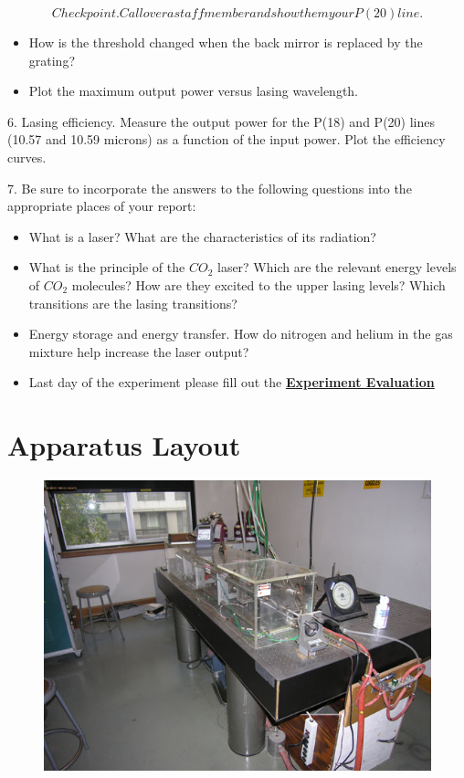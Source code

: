 \documentclass{../lab}
\begin{document}
\begin{equation}
     Checkpoint. Call over a staff member and show them your P(20) line.
\end{equation}
\begin{itemize}
    \item How is the threshold changed when the back mirror is replaced by the grating?
    \item Plot the maximum output power versus lasing wavelength.
\end{itemize}

6. Lasing efficiency. Measure the output power for the P(18) and P(20) lines (10.57 and 10.59 microns) as a function of the input power. Plot the efficiency curves.

7. Be sure to incorporate the answers to the following questions into the appropriate places of your report:

\begin{itemize}
    \item What is a laser? What are the characteristics of its radiation?
    \item What is the principle of the $CO_2 $ laser? Which are the relevant energy levels of $CO_2 $ molecules? How are they excited to the upper lasing levels? Which transitions are the lasing transitions?
    \item Energy storage and energy transfer. How do nitrogen and helium in the gas mixture help increase the laser output?
    \item Last day of the experiment please fill out the \href{\ExperimentEvaluation}{\textbf{Experiment Evaluation}}
\end{itemize}

\section{Apparatus Layout}


\begin{figure}[h]
    \centering
    \href{http://experimentationlab.berkeley.edu/sites/default/files/images/Co2_3.jpg}{\includegraphics[width=\linewidth]{images/Co2_3.jpg}}
    \caption{}
    \label{fig:Co2_3}
\end{figure}
\end{document}
